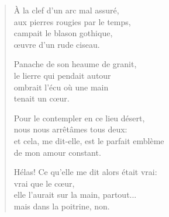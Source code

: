 \begin{verse}
  À la clef d'un arc mal assuré, \\
  aux pierres rougies par le temps, \\
  campait le blason gothique, \\
  œuvre d'un rude ciseau.

  Panache de son heaume de granit, \\
  le lierre qui pendait autour \\
  ombrait l'écu où une main \\
  tenait un cœur.

  Pour le contempler en ce lieu désert, \\
  nous nous arrêtâmes tous deux: \\
  et cela, me dit-elle, est le parfait emblème \\
  de mon amour constant.

  Hélas! Ce qu'elle me dit alors était vrai: \\
  vrai que le cœur, \\
  elle l'aurait sur la main, partout... \\
  mais dans la poitrine, non.
\end{verse}






